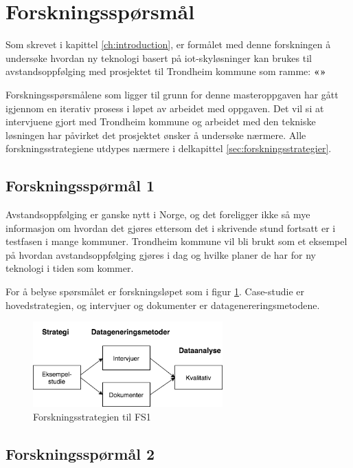 \section{Forskningsspørsmål}
Som skrevet i kapittel \ref{ch:introduction}, er formålet med denne forskningen å undersøke hvordan ny teknologi basert
på \gls{iot}-skyløsninger kan brukes til avstandsoppfølging med prosjektet til Trondheim kommune som ramme:
\textbf{«\fs{}»}

Forskningsspørsmålene som ligger til grunn for denne masteroppgaven har gått igjennom en iterativ prosess i løpet av arbeidet
med oppgaven. Det vil si at intervjuene gjort med Trondheim kommune og arbeidet med den tekniske løsningen har påvirket
det prosjektet ønsker å undersøke nærmere. Alle forskningsstrategiene utdypes nærmere i delkapittel \ref{sec:forskningsstrategier}.

\subsection{Forskningsspørmål 1}
\textbf{}

Avstandsoppfølging er ganske nytt i Norge, og det foreligger ikke så mye informasjon om hvordan det gjøres ettersom
det i skrivende stund fortsatt er i testfasen i mange kommuner. Trondheim kommune vil bli brukt som et eksempel på hvordan avstandsoppfølging
gjøres i dag og hvilke planer de har for ny teknologi i tiden som kommer.

For å belyse spørsmålet er forskningsløpet som i figur \ref{fig:oates_fs1}. Case-studie er hovedstrategien, og intervjuer og dokumenter
er datagenereringsmetodene.

\begin{figure}
\centering
\includegraphics[width=0.65\textwidth]{fig/oates/fs1}
\caption{Forskningsstrategien til FS1}
\label{fig:oates_fs1}
\end{figure}

\subsection{Forskningsspørmål 2}
\textbf{}

